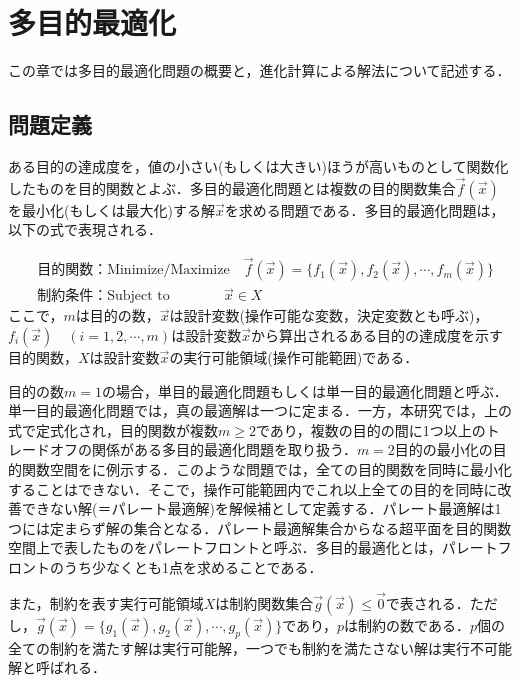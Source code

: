 \chapter{多目的最適化}
\label{chap::multiobjective}

\hspace{1zw}この章では多目的最適化問題の概要と，進化計算による解法について記述する．

\section{問題定義}
ある目的の達成度を，値の小さい(もしくは大きい)ほうが高いものとして関数化したものを目的関数とよぶ．多目的最適化問題とは複数の目的関数集合$\vec{f}(\vec{x})$を最小化(もしくは最大化)する解$\vec{x}$を求める問題である．多目的最適化問題は，以下の式で表現される．

\begin{align}
     & 目的関数：\mbox{Minimize/Maximize} \quad \vec{f}(\vec{x}) = \{f_1(\vec{x}), f_2(\vec{x}),\cdots,f_m(\vec{x})\} \\
     & 制約条件：\mbox{Subject to} \quad ~~~~~~~~~~~~~ \vec{x} \in X
\end{align}
ここで，$m$は目的の数，$\vec{x}$は設計変数(操作可能な変数，決定変数とも呼ぶ)，$f_i(\vec{x}) \quad (i=1, 2,\cdots,m)$は設計変数$\vec{x}$から算出されるある目的の達成度を示す目的関数，$X$は設計変数$\vec{x}$の実行可能領域(操作可能範囲)である．


目的の数$m=1$の場合，単目的最適化問題もしくは単一目的最適化問題と呼ぶ．単一目的最適化問題では，真の最適解は一つに定まる．一方，本研究では，上の式で定式化され，目的関数が複数$m \geq 2$であり，複数の目的の間に1つ以上のトレードオフの関係がある多目的最適化問題を取り扱う．$m=2$目的の最小化の目的関数空間をに例示する．このような問題では，全ての目的関数を同時に最小化することはできない．そこで，操作可能範囲内でこれ以上全ての目的を同時に改善できない解(＝パレート最適解)を解候補として定義する．パレート最適解は1つには定まらず解の集合となる．パレート最適解集合からなる超平面を目的関数空間上で表したものをパレートフロントと呼ぶ．多目的最適化とは，パレートフロントのうち少なくとも1点を求めることである．

また，制約を表す実行可能領域$X$は制約関数集合$\vec{g}(\vec{x}) \leq \vec{0}$で表される．ただし，$\vec{g}(\vec{x})=\{g_1(\vec{x}), g_2(\vec{x}),\cdots,g_p(\vec{x})\}$であり，$p$は制約の数である．$p$個の全ての制約を満たす解は実行可能解，一つでも制約を満たさない解は実行不可能解と呼ばれる．

